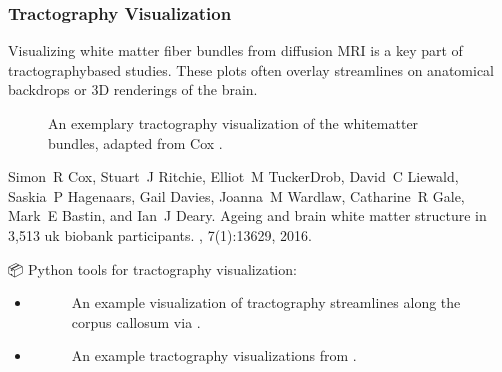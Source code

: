 \documentclass[letterpaper,10pt,english]{jupyterBook}
\begin{document}
\subsubsection{Tractography Visualization}
\label{\detokenize{chapters/03/03b_visualization-tools:tractography-visualization}}
\sphinxAtStartPar
Visualizing white matter fiber bundles from diffusion MRI is a key part of tractography\sphinxhyphen{}based studies. These plots often overlay streamlines on anatomical backdrops or 3D renderings of the brain.

\begin{figure}[htbp]
\centering
\capstart

\noindent{}
\caption{An exemplary tractography visualization of the white\sphinxhyphen{}matter bundles, adapted from Cox \sphinxfootnotemark[5].}\label{\detokenize{chapters/03/03b_visualization-tools:bundle}}\end{figure}
%
\begin{footnotetext}[5]\sphinxAtStartFootnote
Simon R Cox, Stuart J Ritchie, Elliot M Tucker\sphinxhyphen{}Drob, David C Liewald, Saskia P Hagenaars, Gail Davies, Joanna M Wardlaw, Catharine R Gale, Mark E Bastin, and Ian J Deary. Ageing and brain white matter structure in 3,513 uk biobank participants. , 7(1):13629, 2016.
%
\end{footnotetext}\ignorespaces 
\sphinxAtStartPar
📦 Python tools for tractography visualization:
\begin{itemize}
\item {} 
\sphinxAtStartPar
{}

\begin{figure}[htbp]
\centering
\capstart

\noindent{}
\caption{An example visualization of tractography streamlines along the corpus callosum via .}\label{\detokenize{chapters/03/03b_visualization-tools:dipy-tract}}\end{figure}

\item {} 
\sphinxAtStartPar
{}

\begin{figure}[htbp]
\centering
\capstart

\noindent{}
\caption{An example tractography visualizations from .}\label{\detokenize{chapters/03/03b_visualization-tools:surfice-tract}}\end{figure}

\end{itemize}
\end{document}
